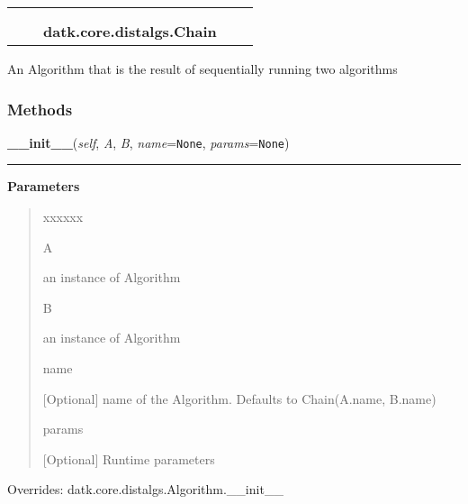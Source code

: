     \label{datk:core:distalgs:Chain}
\begin{tabular}{cccccc}
\multicolumn{2}{r}{\settowidth{\BCL}{datk.core.distalgs.Algorithm}\multirow{2}{\BCL}{datk.core.distalgs.Algorithm}}
&&
  \\\cline{3-3}
  &&\multicolumn{1}{c|}{}
&&
  \\
&&\multicolumn{2}{l}{\textbf{datk.core.distalgs.Chain}}
\end{tabular}

An Algorithm that is the result of sequentially running two algorithms



  \subsubsection{Methods}

    \vspace{0.5ex}

\hspace{.8\funcindent}\begin{boxedminipage}{\funcwidth}

    \raggedright \textbf{\_\_init\_\_}(\textit{self}, \textit{A}, \textit{B}, \textit{name}={\tt None}, \textit{params}={\tt None})

    \vspace{-1.5ex}

    \rule{\textwidth}{0.5\fboxrule}
\setlength{\parskip}{2ex}
\setlength{\parskip}{1ex}
      \textbf{Parameters}
      \vspace{-1ex}

      \begin{quote}
        \begin{Ventry}{xxxxxx}

          \item[A]

          an instance of Algorithm

          \item[B]

          an instance of Algorithm

          \item[name]

          [Optional] name of the Algorithm. Defaults to Chain(A.name, 
          B.name)

          \item[params]

          [Optional] Runtime parameters

        \end{Ventry}

      \end{quote}

      Overrides: datk.core.distalgs.Algorithm.\_\_init\_\_

    \end{boxedminipage}


